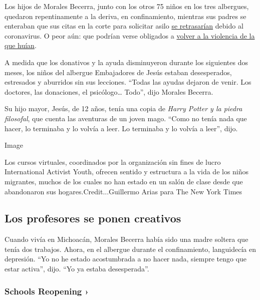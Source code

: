Los hijos de Morales Becerra, junto con los otros 75 niños en los tres
albergues, quedaron repentinamente a la deriva, en confinamiento,
mientras sus padres se enteraban que sus citas en la corte para
solicitar asilo
\href{https://www.nytimes3xbfgragh.onion/2020/03/17/us/politics/trump-coronavirus-mexican-border.html}{se
retrasarían} debido al coronavirus. O peor aún: que podrían verse
obligados a
\href{https://www.nytimes3xbfgragh.onion/es/2020/03/19/espanol/america-latina/solicitantes-de-asilo-estados-unidos.html}{volver
a la violencia de la que huían}.

A medida que los donativos y la ayuda disminuyeron durante los
siguientes dos meses, los niños del albergue Embajadores de Jesús
estaban desesperados, estresados y aburridos sin sus lecciones. ``Todas
las ayudas dejaron de venir. Los doctores, las donaciones, el
psicólogo\ldots{} Todo'', dijo Morales Becerra.

Su hijo mayor, Jesús, de 12 años, tenía una copia de \emph{Harry Potter
y la piedra filosofal}, que cuenta las aventuras de un joven mago.
``Como no tenía nada que hacer, lo terminaba y lo volvía a leer. Lo
terminaba y lo volvía a leer'', dijo.

Image

Los cursos virtuales, coordinados por la organización sin fines de lucro
International Activist Youth, ofrecen sentido y estructura a la vida de
los niños migrantes, muchos de los cuales no han estado en un salón de
clase desde que abandonaron sus hogares.Credit...Guillermo Arias para
The New York Times

\hypertarget{los-profesores-se-ponen-creativos}{%
\subsection{Los profesores se ponen
creativos}\label{los-profesores-se-ponen-creativos}}

Cuando vivía en Michoacán, Morales Becerra había sido una madre soltera
que tenía dos trabajos. Ahora, en el albergue durante el confinamiento,
languidecía en depresión. ``Yo no he estado acostumbrada a no hacer
nada, siempre tengo que estar activa'', dijo. ``Yo ya estaba
desesperada''.

\href{https://www.nytimes3xbfgragh.onion/spotlight/schools-reopening?action=click\&pgtype=Article\&state=default\&region=MAIN_CONTENT_3\&context=storylines_keepup}{}

\hypertarget{schools-reopening-}{%
\subsubsection{Schools Reopening ›}\label{schools-reopening-}}

